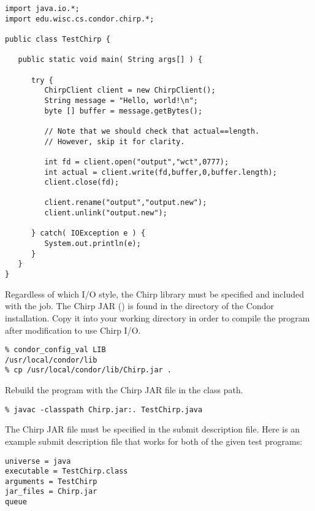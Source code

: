 \begin{verbatim}
import java.io.*;
import edu.wisc.cs.condor.chirp.*;

public class TestChirp {

   public static void main( String args[] ) {

      try {
         ChirpClient client = new ChirpClient();
         String message = "Hello, world!\n";
         byte [] buffer = message.getBytes();

         // Note that we should check that actual==length.
         // However, skip it for clarity.

         int fd = client.open("output","wct",0777);
         int actual = client.write(fd,buffer,0,buffer.length);
         client.close(fd);

         client.rename("output","output.new");
         client.unlink("output.new");

      } catch( IOException e ) {
         System.out.println(e);
      }
   }
}
\end{verbatim}

Regardless of which I/O style, 
the Chirp library must be specified and included with the job.
The Chirp JAR ()
is found in the  directory of the Condor installation.
Copy it into your working directory in order to
compile the program after modification to use Chirp I/O.

\begin{verbatim}
% condor_config_val LIB
/usr/local/condor/lib
% cp /usr/local/condor/lib/Chirp.jar .
\end{verbatim}

Rebuild the program with the Chirp JAR file in the class path.

\begin{verbatim}
% javac -classpath Chirp.jar:. TestChirp.java
\end{verbatim}

The Chirp JAR file must be specified in the submit description file.
Here is an example submit description file that works for both
of the given test programs:

\begin{verbatim}
universe = java
executable = TestChirp.class
arguments = TestChirp
jar_files = Chirp.jar
queue
\end{verbatim}
